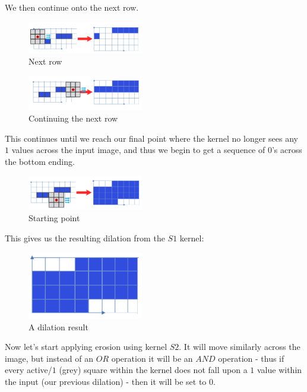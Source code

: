 \documentclass{article}
\begin{document}
We then continue onto the next row.

\begin{figure}[H]
    \centering
    \includegraphics[width = 0.45\textwidth]{imgs/5/a4.png}
    \caption{Next row}
    \label{fig:a4}
\end{figure}

\begin{figure}[H]
    \centering
    \includegraphics[width = 0.45\textwidth]{imgs/5/a5.png}
    \caption{Continuing the next row}
    \label{fig:a5}
\end{figure}

This continues until we reach our final point where the kernel no longer sees any $1$ values across the input image, and thus we begin to get a sequence of $0$'s across the bottom ending.

\begin{figure}[H]
    \centering
    \includegraphics[width = 0.45\textwidth]{imgs/5/a6.png}
    \caption{Starting point}
    \label{fig:a6}
\end{figure}

This gives us the resulting dilation from the $S1$ kernel:

\begin{figure}[H]
    \centering
    \includegraphics[width = 0.45\textwidth]{imgs/5/a7.png}
    \caption{A dilation result}
    \label{fig:a7}
\end{figure}

Now let's start applying erosion using kernel $S2$. It will move similarly across the image, but instead of an $OR$ operation it will be an $AND$ operation - thus if every active/$1$ (grey) square within the kernel does not fall upon a $1$ value within the input (our previous dilation) - then it will be set to $0$.
\end{document}
